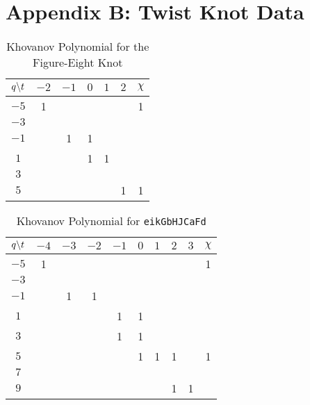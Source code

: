 \documentclass{article}
\theoremstyle{plain}
\begin{document}
    \section{Appendix B: Twist Knot Data}
        \begin{table}[H]
            \centering
            \begin{tabular}{| c | c | c | c | c | c | c |}
                \hline
                $q\symbol{92}t$&$-2$&$-1$&$0$&$1$&$2$&$\chi$\\
                \hline
                $-5$&1&&&&&1\\
                \hline
                $-3$&&&&&&\\
                \hline
                $-1$&&1&1&&&\\
                \hline
                $1$&&&1&1&&\\
                \hline
                $3$&&&&&&\\
                \hline
                $5$&&&&&1&1\\
                \hline
            \end{tabular}
            \caption{Khovanov Polynomial for the Figure-Eight Knot}
            \label{table:m_2_kho}
        \end{table}
        \begin{table}[H]
            \centering
            \begin{tabular}{| c | c | c | c | c | c | c | c | c | c |}
                \hline
                $q\symbol{92}t$&$-4$&$-3$&$-2$&$-1$&$0$&$1$&$2$&$3$&$\chi$\\
                \hline
                $-5$&1&&&&&&&&1\\
                \hline
                $-3$&&&&&&&&&\\
                \hline
                $-1$&&1&1&&&&&&\\
                \hline
                $1$&&&&1&1&&&&\\
                \hline
                $3$&&&&1&1&&&&\\
                \hline
                $5$&&&&&1&1&1&&1\\
                \hline
                $7$&&&&&&&&&\\
                \hline
                $9$&&&&&&&1&1&\\
                \hline
            \end{tabular}
            \caption{Khovanov Polynomial for \texttt{eikGbHJCaFd}}
            \label{table:eikGbHJCaFd_kho}
        \end{table}
\end{document}

